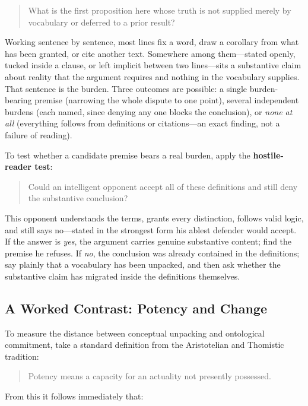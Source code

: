 \begin{quote}
What is the first proposition here whose truth is not supplied merely by vocabulary or deferred to a prior result?
\end{quote}

Working sentence by sentence, most lines fix a word, draw a corollary from what has been granted, or cite another text. Somewhere among them---stated openly, tucked inside a clause, or left implicit between two lines---sits a substantive claim about reality that the argument requires and nothing in the vocabulary supplies. That sentence is the burden. Three outcomes are possible: a single burden-bearing premise (narrowing the whole dispute to one point), several independent burdens (each named, since denying any one blocks the conclusion), or \emph{none at all} (everything follows from definitions or citations---an exact finding, not a failure of reading).

To test whether a candidate premise bears a real burden, apply the \textbf{hostile-reader test}:

\begin{quote}
Could an intelligent opponent accept all of these definitions and still deny the substantive conclusion?
\end{quote}

This opponent understands the terms, grants every distinction, follows valid logic, and still says no---stated in the strongest form his ablest defender would accept. If the answer is \emph{yes}, the argument carries genuine substantive content; find the premise he refuses. If \emph{no}, the conclusion was already contained in the definitions; say plainly that a vocabulary has been unpacked, and then ask whether the substantive claim has migrated inside the definitions themselves.

\subsection{A Worked Contrast: Potency and Change}

To measure the distance between conceptual unpacking and ontological commitment, take a standard definition from the Aristotelian and Thomistic tradition:

\begin{quote}
Potency means a capacity for an actuality not presently possessed.
\end{quote}

From this it follows immediately that:

